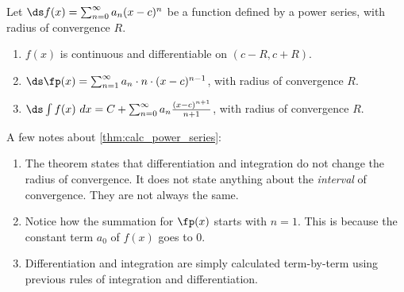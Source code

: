 {Let $\ds f(x) = \sum_{n=0}^\infty a_n(x-c)^n$ be a function defined by a power series, with radius of convergence $R$.
\begin{enumerate}
	\item $f(x)$ is continuous and differentiable on $(c-R,c+R)$.
	\item	$\ds \fp(x) = \sum_{n=1}^\infty a_n\cdot n\cdot (x-c)^{n-1}$, with radius of convergence $R$.
	\item	$\ds \int f(x)\ dx = C+\sum_{n=0}^\infty a_n\frac{(x-c)^{n+1}}{n+1}$, with radius of convergence $R$.
\end{enumerate}}

A few notes about \autoref{thm:calc_power_series}:
\begin{enumerate}
	\item The theorem states that differentiation and integration do not change the radius of convergence. It does not state anything about the \emph{interval} of convergence. They are not always the same.
	\item	Notice how the summation for $\fp(x)$ starts with $n=1$. This is because the constant term $a_0$ of $f(x)$ goes to 0.
	\item	Differentiation and integration are simply calculated term-by-term using previous rules of integration and differentiation.
\end{enumerate}

